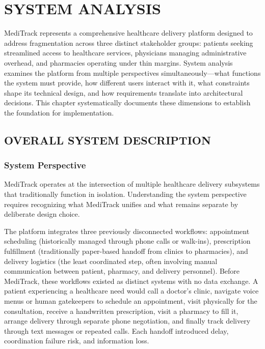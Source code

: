 \documentclass[12pt,a4paper]{report}
\begin{document}
\setcounter{chapter}{2}

\chapter{SYSTEM ANALYSIS}

MediTrack represents a comprehensive healthcare delivery platform designed to address fragmentation across three distinct stakeholder groups: patients seeking streamlined access to healthcare services, physicians managing administrative overhead, and pharmacies operating under thin margins. System analysis examines the platform from multiple perspectives simultaneously—what functions the system must provide, how different users interact with it, what constraints shape its technical design, and how requirements translate into architectural decisions. This chapter systematically documents these dimensions to establish the foundation for implementation.

\section{OVERALL SYSTEM DESCRIPTION}

\subsection{System Perspective}

MediTrack operates at the intersection of multiple healthcare delivery subsystems that traditionally function in isolation. Understanding the system perspective requires recognizing what MediTrack unifies and what remains separate by deliberate design choice.

The platform integrates three previously disconnected workflows: appointment scheduling (historically managed through phone calls or walk-ins), prescription fulfillment (traditionally paper-based handoff from clinics to pharmacies), and delivery logistics (the least coordinated step, often involving manual communication between patient, pharmacy, and delivery personnel). Before MediTrack, these workflows existed as distinct systems with no data exchange. A patient experiencing a healthcare need would call a doctor's clinic, navigate voice menus or human gatekeepers to schedule an appointment, visit physically for the consultation, receive a handwritten prescription, visit a pharmacy to fill it, arrange delivery through separate phone negotiation, and finally track delivery through text messages or repeated calls. Each handoff introduced delay, coordination failure risk, and information loss.
\end{document}
